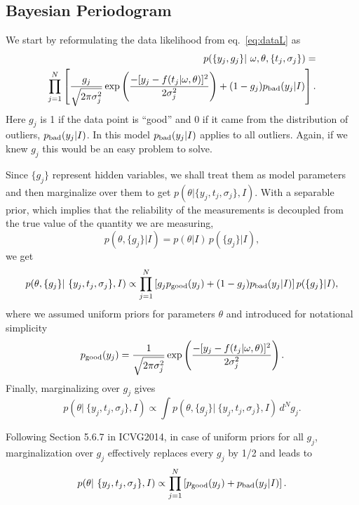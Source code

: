 \documentclass[12pt,pdftex]{article}
\begin{document}
\subsection{Bayesian Periodogram} 

We start by reformulating the data likelihood from eq.~\ref{eq:dataL}  as
\begin{eqnarray}
\label{eq:dataL2} 
    p(\{y_j, g_j\} |~\omega, \theta, \{t_j, \sigma_j\}) = \nonumber \\ 
  \prod_{j=1}^{N} \left[ \frac{g_j}{\sqrt{2\pi\sigma_j^2}} \exp\left(
  \frac{-[y_j - f(t_j|\omega, \theta)]^2}{2\sigma_j^2}\right) + 
       (1-g_j) p_{\rm bad}(y_j|I) \right].
\end{eqnarray}  
Here $g_j$ is 1 if the data point is ``good'' and 0 if it came from the distribution
of outliers, $p_{\rm bad}(y_j|I)$. In this model $p_{\rm bad}(y_j|I)$ applies to all
outliers. Again, if we knew $g_j$ this would be an easy problem to solve.

Since $\{g_j\}$ represent hidden variables, we shall treat them as model parameters and then
marginalize over them to get $p(\theta|\{y_j, t_j, \sigma_j\} ,I)$. With a separable prior,
which implies that the reliability of the measurements is decoupled from the true value
of the quantity we are measuring,
\begin{equation}
        p(\theta,\{g_j\}|I) = p(\theta|I)  \, p(\{g_j\}|I),
\end{equation}
we get
\begin{equation}
   p(\theta,\{g_j\}|~\{y_j, t_j, \sigma_j\}, I) \propto \prod_{j=1}^{N} \left[ g_j p_{\rm good}(y_j)   + (1-g_j) p_{\rm bad}(y_j|I) \right] p(\{g_j\}|I),
\end{equation}
where we assumed uniform priors for parameters $\theta$ and introduced for notational simplicity
\begin{equation}
       p_{\rm good}(y_j) = \frac{1}{\sqrt{2\pi\sigma_j^2}} \exp\left(
                  \frac{-[y_j - f(t_j|\omega, \theta)]^2}{2\sigma_j^2}\right). 
\end{equation}
Finally, marginalizing over $g_j$ gives
\begin{equation}
  p(\theta|~\{y_j, t_j, \sigma_j\}, I) \propto \int  p(\theta,\{g_j\}|~\{y_j, t_j, \sigma_j\}, I) \, d^N g_j.
\end{equation}


Following Section 5.6.7 in ICVG2014, in case of uniform priors for all $g_j$, marginalization over
$g_j$ effectively replaces every $g_j$ by 1/2 and leads to 
\begin{equation}
\label{eq:Btheta}
   p(\theta|~\{y_j, t_j, \sigma_j\}, I) \propto \prod_{j=1}^{N} \left[ p_{\rm good}(y_j)  + p_{\rm bad}(y_j|I) \right]. 
\end{equation}
\end{document}
